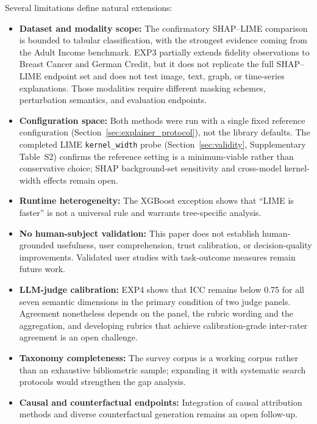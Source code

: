 \documentclass[10pt]{article}
\begin{document}
Several limitations define natural extensions:
\begin{itemize}[leftmargin=*]
\item \textbf{Dataset and modality scope:} The confirmatory SHAP--LIME
comparison is bounded to tabular classification, with the strongest
evidence coming from the Adult Income benchmark. EXP3 partially extends
fidelity observations to Breast Cancer and German Credit, but it does not
replicate the full SHAP--LIME endpoint set and does not test image, text,
graph, or time-series explanations. Those modalities require different
masking schemes, perturbation semantics, and evaluation endpoints.
\item \textbf{Configuration space:} Both methods were run with a single
fixed reference configuration (Section~\ref{sec:explainer_protocol}), not
the library defaults. The completed LIME \texttt{kernel\_width} probe
(Section~\ref{sec:validity}, Supplementary Table~S2) confirms the
reference setting is a minimum-viable rather than conservative choice;
SHAP background-set sensitivity and cross-model kernel-width effects
remain open.
\item \textbf{Runtime heterogeneity:} The XGBoost exception shows that
``LIME is faster'' is not a universal rule and warrants tree-specific analysis.
\item \textbf{No human-subject validation:} This paper does not establish
human-grounded usefulness, user comprehension, trust calibration, or
decision-quality improvements. Validated user studies with task-outcome
measures remain future work.
\item \textbf{LLM-judge calibration:} EXP4 shows that ICC remains below
0.75 for all seven semantic dimensions in the primary condition of two judge
panels. Agreement nonetheless depends on the panel, the rubric wording and the
aggregation, and developing rubrics that achieve calibration-grade inter-rater
agreement is an open challenge.
\item \textbf{Taxonomy completeness:} The survey corpus is a working
corpus rather than an exhaustive bibliometric sample; expanding it with
systematic search protocols would strengthen the gap analysis.
\item \textbf{Causal and counterfactual endpoints:} Integration of
causal attribution methods and diverse counterfactual generation
\citep{mothilal2020dice} remains an open follow-up.
\end{itemize}

\end{document}
